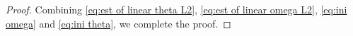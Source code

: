 \documentclass[10pt,a4paper]{amsart}
\begin{document}
\begin{proof}
		Combining \eqref{eq:est of linear theta L2}, \eqref{eq:est of linear omega L2}, \eqref{eq:ini omega} and \eqref{eq:ini theta}, we complete the proof.
	\end{proof}
\end{document}
